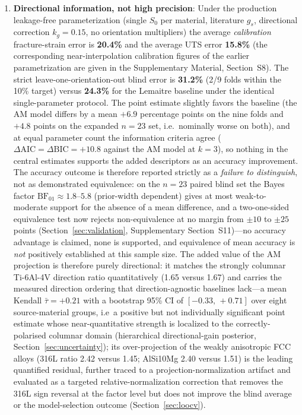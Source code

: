 \documentclass[12pt,a4paper,twocolumn]{article}
\begin{document}
\begin{enumerate}
    \item \textbf{Directional information, not high precision}: Under the production leakage-free parameterization (single $S_0$ per material, literature $g_s$, directional correction $k_g = 0.15$, no orientation multipliers) the average \emph{calibration} fracture-strain error is \textbf{20.4\%} and the average UTS error \textbf{15.8\%} (the corresponding near-interpolation calibration figures of the earlier parametrization are given in the Supplementary Material, Section~S8). The strict leave-one-orientation-out blind error is \textbf{31.2\%} (2/9 folds within the 10\% target) versus \textbf{24.3\%} for the Lemaitre baseline under the identical single-parameter protocol. The point estimate slightly favors the baseline (the AM model differs by a mean $+6.9$ percentage points on the nine folds and $+4.8$ points on the expanded $n=23$ set, i.e.\ nominally worse on both), and at equal parameter count the information criteria agree ($\Delta\mathrm{AIC} = \Delta\mathrm{BIC} = +10.8$ against the AM model at $k=3$), so nothing in the central estimates supports the added descriptors as an accuracy improvement. The accuracy outcome is therefore reported strictly as a \emph{failure to distinguish}, not as demonstrated equivalence: on the $n=23$ paired blind set the Bayes factor $\mathrm{BF}_{01}\approx1.8$--$5.8$ (prior-width dependent) gives at most weak-to-moderate support for the absence of a mean difference, and a two-one-sided equivalence test now rejects non-equivalence at no margin from $\pm10$ to $\pm25$ points (Section~\ref{sec:validation}, Supplementary Section~S11)---no accuracy advantage is claimed, none is supported, and equivalence of mean accuracy is \emph{not} positively established at this sample size. The added value of the AM projection is therefore purely directional: it matches the strongly columnar Ti-6Al-4V direction ratio quantitatively (1.65 versus 1.67) and carries the measured direction ordering that direction-agnostic baselines lack---a mean Kendall $\bar\tau = +0.21$ with a bootstrap 95\% CI of $[-0.33,\,+0.71]$ over eight source-material groups, i.e\ a positive but not individually significant point estimate whose near-quantitative strength is localized to the correctly-polarised columnar domain (hierarchical directional-gain posterior, Section~\ref{sec:uncertainty}); its over-projection of the weakly anisotropic FCC alloys (316L ratio 2.42 versus 1.45; AlSi10Mg 2.40 versus 1.51) is the leading quantified residual, further traced to a projection-normalization artifact and evaluated as a targeted relative-normalization correction that removes the 316L sign reversal at the factor level but does not improve the blind average or the model-selection outcome (Section~\ref{sec:loocv}).
    

\end{enumerate}
\end{document}
